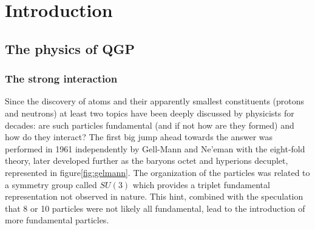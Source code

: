 
\chapter{Introduction}  %





\section{The physics of QGP} %
\subsection{The strong interaction}
Since the discovery of atoms and their apparently smallest constituents (protons and neutrons) at least two topics have been deeply discussed by physicists for decades: are such particles fundamental (and if not how are they formed) and how do they interact?
The first big jump ahead towards the answer was performed in 1961 independently by Gell-Mann and Ne'eman with the eight-fold theory, later developed further as the baryons octet and hyperions decuplet, represented in figure\ref{fig:gelmann}.
The organization of the particles was related to a symmetry group called $SU(3)$ which provides a triplet fundamental representation not observed in nature.
This hint, combined with the speculation that 8 or 10 particles were not likely all fundamental, lead to the introduction of more fundamental particles.


